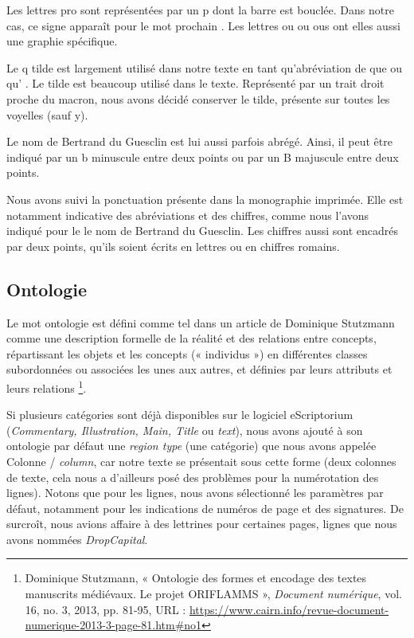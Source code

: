 \documentclass{article}
\begin{document}
Les lettres \og pro \fg\hspace{0.5mm} sont représentées par un p dont la barre est bouclée. Dans notre cas, ce signe apparaît pour le mot  \og prochain \fg\hspace{0.5mm}. Les lettres \og ou \fg ou \og ous \fg ont elles aussi une graphie spécifique.

Le q tilde est largement utilisé dans notre texte en tant qu'abréviation de \og que \fg\hspace{0.5mm} ou \og qu' \fg\hspace{0.5mm}. Le tilde est beaucoup utilisé dans le texte. Représenté par un trait droit proche du macron, nous avons décidé conserver le tilde, présente sur toutes les voyelles (sauf y).

Le nom de Bertrand du Guesclin est lui aussi parfois abrégé. Ainsi, il peut être indiqué par un \og b \fg\hspace{0.5mm} minuscule entre deux points ou par un \og B \fg\hspace{0.5mm} majuscule entre deux points.

Nous avons suivi la ponctuation présente dans la monographie imprimée. Elle est notamment indicative des abréviations et des chiffres, comme nous l'avons indiqué pour le le nom de Bertrand du Guesclin. Les chiffres aussi sont encadrés par deux points, qu'ils soient écrits en lettres ou en chiffres romains.

\subsection{Ontologie}

Le mot \og ontologie \fg\hspace{0.5mm} est défini comme tel dans un article de Dominique Stutzmann comme une \og description formelle de la réalité et des relations entre concepts, répartissant les objets et les concepts (« individus ») en différentes classes subordonnées ou associées les unes aux autres, et définies par leurs attributs et leurs relations \fg\footnote{Dominique Stutzmann, « Ontologie des formes et encodage des textes manuscrits médiévaux. Le projet ORIFLAMMS », \textit{Document numérique}, vol. 16, no. 3, 2013, pp. 81-95, URL : \url{https://www.cairn.info/revue-document-numerique-2013-3-page-81.htm\#no1}}. 

Si plusieurs catégories sont déjà disponibles sur le logiciel eScriptorium (\textit{Commentary, Illustration, Main, Title} ou \textit{text}), nous avons ajouté à son ontologie par défaut une \og \textit{region type} \fg\hspace{0.5mm} (une catégorie) que nous avons appelée  \og Colonne / \textit{column}\fg\hspace{0.5mm}, car notre texte se présentait sous cette forme (deux colonnes de texte, cela nous a d'ailleurs posé des problèmes pour la numérotation des lignes). Notons que pour les lignes, nous avons sélectionné les paramètres par défaut, notamment pour les indications de numéros de page et des signatures. De surcroît, nous avions affaire à des lettrines pour certaines pages, lignes que nous avons nommées \og \textit{DropCapital}\fg. 
\end{document}
